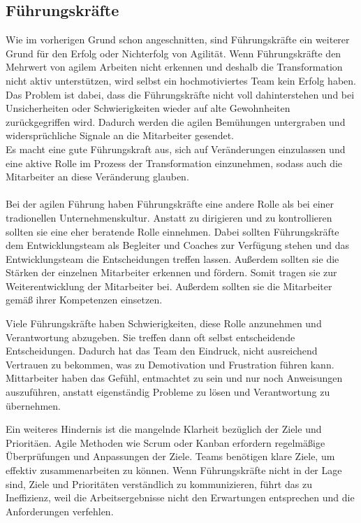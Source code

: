 \documentclass[ngerman]{seminarvorlage}
\begin{document}
\subsection{Führungskräfte}
Wie im vorherigen Grund schon angeschnitten, sind Führungskräfte ein weiterer Grund für den Erfolg oder Nichterfolg von Agilität. Wenn Führungskräfte den Mehrwert von agilem Arbeiten nicht erkennen und deshalb die Transformation nicht aktiv unterstützen, wird selbst ein hochmotiviertes Team kein Erfolg haben. Das Problem ist dabei, dass die Führungskräfte nicht voll dahinterstehen und bei Unsicherheiten oder Schwierigkeiten wieder auf alte Gewohnheiten zurückgegriffen wird. Dadurch werden die agilen Bemühungen untergraben und widersprüchliche Signale an die Mitarbeiter gesendet.\\
Es macht eine gute Führungskraft aus, sich auf Veränderungen einzulassen und eine aktive Rolle im Prozess der Transformation einzunehmen, sodass auch die Mitarbeiter an diese Veränderung glauben.\\\\
Bei der agilen Führung haben Führungskräfte eine andere Rolle als bei einer tradionellen Unternehmenskultur. Anstatt zu dirigieren und zu kontrollieren sollten sie eine eher beratende Rolle einnehmen. Dabei sollten Führungskräfte dem Entwicklungsteam als Begleiter und Coaches zur Verfügung stehen und das Entwicklungsteam die Entscheidungen treffen lassen. Außerdem sollten sie die Stärken der einzelnen Mitarbeiter erkennen und fördern. Somit tragen sie zur Weiterentwicklung der Mitarbeiter bei. Außerdem sollten sie die Mitarbeiter gemäß ihrer Kompetenzen einsetzen.\cite{cleverlance.2024}

Viele Führungskräfte haben Schwierigkeiten, diese Rolle anzunehmen und Verantwortung abzugeben. Sie treffen dann oft selbst entscheidende Entscheidungen. Dadurch hat das Team den Eindruck, nicht ausreichend Vertrauen zu bekommen, was zu Demotivation und Frustration führen kann. Mittarbeiter haben das Gefühl, entmachtet zu sein und nur noch Anweisungen auszuführen, anstatt eigenständig Probleme zu lösen und Verantwortung zu übernehmen.

Ein weiteres Hindernis ist die mangelnde Klarheit bezüglich der Ziele und Prioritäen. Agile Methoden wie Scrum oder Kanban erfordern regelmäßige Überprüfungen und Anpassungen der Ziele. Teams benötigen klare Ziele, um effektiv zusammenarbeiten zu können. Wenn Führungskräfte nicht in der Lage sind, Ziele und Prioritäten verständlich zu kommunizieren, führt das zu Ineffizienz, weil die Arbeitsergebnisse nicht den Erwartungen entsprechen und die Anforderungen verfehlen.
\end{document}
